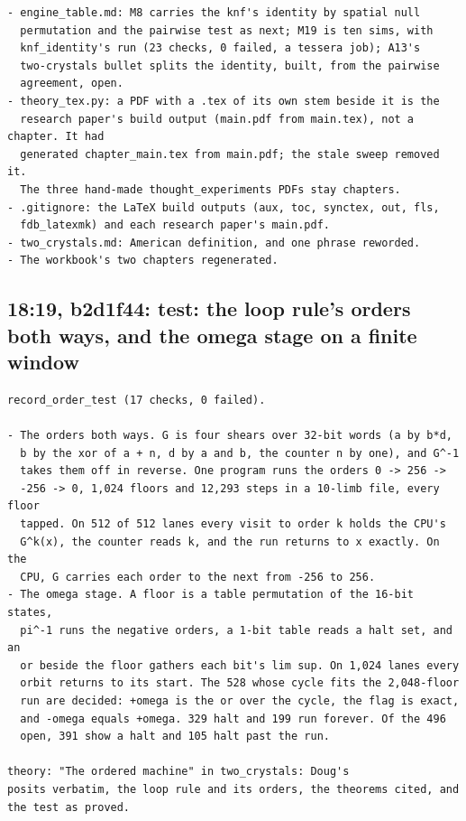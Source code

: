 \begin{Verbatim}
- engine_table.md: M8 carries the knf's identity by spatial null
  permutation and the pairwise test as next; M19 is ten sims, with
  knf_identity's run (23 checks, 0 failed, a tessera job); A13's
  two-crystals bullet splits the identity, built, from the pairwise
  agreement, open.
- theory_tex.py: a PDF with a .tex of its own stem beside it is the
  research paper's build output (main.pdf from main.tex), not a chapter. It had
  generated chapter_main.tex from main.pdf; the stale sweep removed it.
  The three hand-made thought_experiments PDFs stay chapters.
- .gitignore: the LaTeX build outputs (aux, toc, synctex, out, fls,
  fdb_latexmk) and each research paper's main.pdf.
- two_crystals.md: American definition, and one phrase reworded.
- The workbook's two chapters regenerated.
\end{Verbatim}

\subsection{\texorpdfstring{18:19, b2d1f44: test: the loop rule's orders both ways, and the omega stage on a finite window}{18:19, b2d1f44: test: the loop rule's orders both ways, and the omega stage on a finite window}}

\begin{Verbatim}
record_order_test (17 checks, 0 failed).

- The orders both ways. G is four shears over 32-bit words (a by b*d,
  b by the xor of a + n, d by a and b, the counter n by one), and G^-1
  takes them off in reverse. One program runs the orders 0 -> 256 ->
  -256 -> 0, 1,024 floors and 12,293 steps in a 10-limb file, every floor
  tapped. On 512 of 512 lanes every visit to order k holds the CPU's
  G^k(x), the counter reads k, and the run returns to x exactly. On the
  CPU, G carries each order to the next from -256 to 256.
- The omega stage. A floor is a table permutation of the 16-bit states,
  pi^-1 runs the negative orders, a 1-bit table reads a halt set, and an
  or beside the floor gathers each bit's lim sup. On 1,024 lanes every
  orbit returns to its start. The 528 whose cycle fits the 2,048-floor
  run are decided: +omega is the or over the cycle, the flag is exact,
  and -omega equals +omega. 329 halt and 199 run forever. Of the 496
  open, 391 show a halt and 105 halt past the run.

theory: "The ordered machine" in two_crystals: Doug's
posits verbatim, the loop rule and its orders, the theorems cited, and
the test as proved.
\end{Verbatim}

